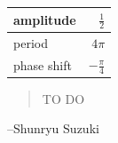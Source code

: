 \documentclass{exam}
\begin{document}
\begin{description}
        \begin{tabular}[H]{lr}
          \toprule
          amplitude & $\frac{1}{2}$ \\
          \midrule
          period & $4 \pi$ \\
          \midrule
          phase shift & $- \frac{\pi}{4}$ \\
          \bottomrule
        \end{tabular}

    \end{description}
  \else
    \vspace{1 cm}
    \begin{quote}
      \begin{em}
        TO DO
      \end{em}
    \end{quote}
    \hspace{1 cm} --Shunryu Suzuki
  \fi
\end{document}
